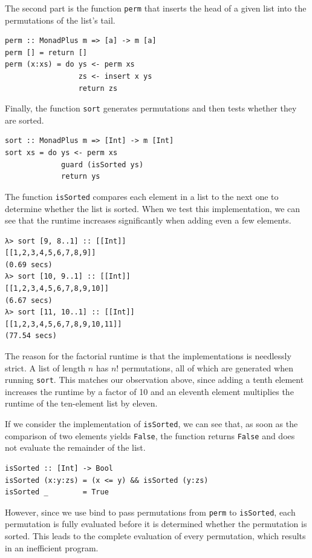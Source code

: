 \documentclass[a4paper, 11pt, fleqn, twoside]{scrreprt}
\newcommand{\hinl}[1]{\texttt{#1}}
\begin{document}
The second part is the function \hinl{perm} that inserts the head of a given list into the permutations of the list's tail.

\begin{verbatim}
perm :: MonadPlus m => [a] -> m [a]
perm [] = return []
perm (x:xs) = do ys <- perm xs
                 zs <- insert x ys
                 return zs
\end{verbatim}

Finally, the function \hinl{sort} generates permutations and then tests whether they are sorted.

\begin{verbatim}
sort :: MonadPlus m => [Int] -> m [Int]
sort xs = do ys <- perm xs
             guard (isSorted ys)
             return ys
\end{verbatim}

The function \hinl{isSorted} compares each element in a list to the next one to determine whether the list is sorted.
When we test this implementation, we can see that the runtime increases significantly when adding even a few elements.

\begin{verbatim}
λ> sort [9, 8..1] :: [[Int]]
[[1,2,3,4,5,6,7,8,9]]
(0.69 secs)
λ> sort [10, 9..1] :: [[Int]]
[[1,2,3,4,5,6,7,8,9,10]]
(6.67 secs)
λ> sort [11, 10..1] :: [[Int]]
[[1,2,3,4,5,6,7,8,9,10,11]]
(77.54 secs)
\end{verbatim}

The reason for the factorial runtime is that the implementations is needlessly strict.
A list of length $n$  has $n!$ permutations, all of which are generated when running \hinl{sort}.
This matches our observation above, since adding a tenth element increases the runtime by a factor of 10 and an eleventh element multiplies the runtime of the ten-element list by eleven.

If we consider the implementation of \hinl{isSorted}, we can see that, as soon as the comparison of two elements yields \hinl{False}, the function returns \hinl{False} and does not evaluate the remainder of the list.

\begin{verbatim}
isSorted :: [Int] -> Bool
isSorted (x:y:zs) = (x <= y) && isSorted (y:zs)
isSorted _        = True
\end{verbatim}

However, since we use bind to pass permutations from \hinl{perm} to \hinl{isSorted}, each permutation is fully evaluated before it is determined whether the permutation is sorted.
This leads to the complete evaluation of every permutation, which results in an inefficient program.
\end{document}
